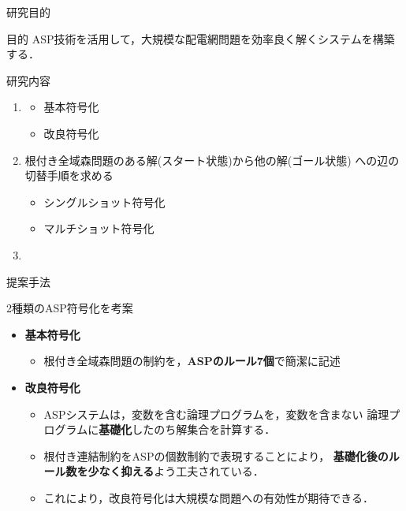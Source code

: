 \documentclass[dvipdfmx,11pt]{beamer}
\begin{document}
\begin{frame}{研究目的}
  \begin{alertblock}{目的}\centering
    ASP技術を活用して，大規模な配電網問題を効率良く解くシステムを構築
    する．
  \end{alertblock}
  \vfill
  \begin{block}{研究内容}
    \begin{enumerate}
    \item {}
      \begin{itemize}
      \item 基本符号化
      \item 改良符号化
      \end{itemize}
    \item 根付き全域森問題のある解(スタート状態)から他の解(ゴール状態)
      への辺の切替手順を求める
      \begin{itemize}
      \item シングルショット符号化
      \item マルチショット符号化
      \end{itemize}
    \item {}
    \end{enumerate}
  \end{block}
\end{frame}
\begin{frame}{提案手法}
   \scalebox{0.9}{\centering}
   \begin{block}{2種類のASP符号化を考案}
     \begin{itemize}
     \item \alert{\bf 基本符号化}
       \begin{itemize}
       \item 根付き全域森問題の制約を，\textbf{ASPのルール7個}で簡潔に記述
       \end{itemize}
     \item \alert{\bf 改良符号化}
       \begin{itemize}
       \item ASPシステムは，変数を含む論理プログラムを，変数を含まない
         論理プログラムに\textbf{基礎化}したのち解集合を計算する．
       \item 根付き連結制約をASPの個数制約で表現することにより，
         \textbf{基礎化後のルール数を少なく抑える}よう工夫されている．
       \item これにより，改良符号化は大規模な問題への有効性が期待できる．
       \end{itemize}
     \end{itemize}
   \end{block}
\end{frame}
\end{document}

